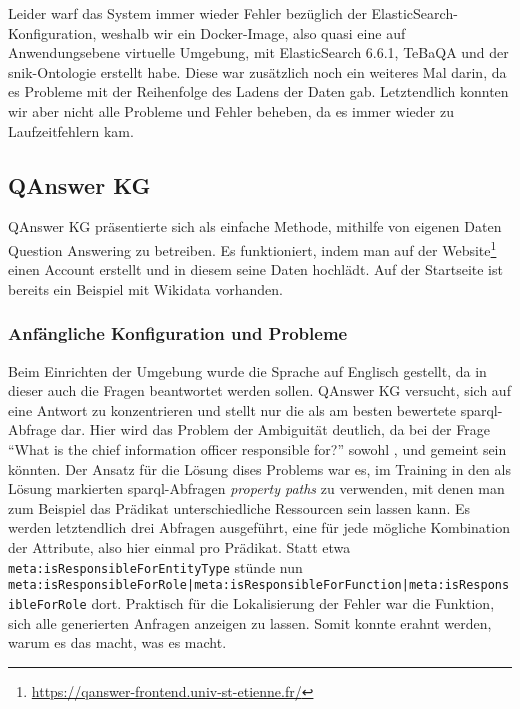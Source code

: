 Leider warf das System immer wieder Fehler bezüglich der ElasticSearch-Konfiguration, weshalb wir ein Docker-Image,
also quasi eine auf Anwendungsebene virtuelle Umgebung, mit ElasticSearch 6.6.1, TeBaQA und der \ac{snik}-Ontologie erstellt habe.
Diese war zusätzlich noch ein weiteres Mal darin, da es Probleme mit der Reihenfolge des Ladens der Daten gab.
Letztendlich konnten wir aber nicht alle Probleme und Fehler beheben, da es immer wieder zu Laufzeitfehlern kam.

\subsection{QAnswer KG}

QAnswer KG präsentierte sich als einfache Methode, mithilfe von eigenen Daten Question Answering zu betreiben.
Es funktioniert, indem man auf der Website\footnote{\url{https://qanswer-frontend.univ-st-etienne.fr/}} einen Account erstellt und in diesem seine Daten hochlädt.
Auf der Startseite ist bereits ein Beispiel mit Wikidata vorhanden.

\subsubsection{Anfängliche Konfiguration und Probleme}

Beim Einrichten der Umgebung wurde die Sprache auf Englisch gestellt, da in dieser auch die Fragen beantwortet werden sollen.
QAnswer KG versucht, sich auf eine Antwort zu konzentrieren und stellt nur die als am besten bewertete \ac{sparql}-Abfrage dar.
Hier wird das Problem der Ambiguität deutlich, da bei der Frage \enquote{What is the chief information officer responsible for?} sowohl
,  und  gemeint sein könnten.
Der Ansatz für die Lösung dises Problems war es, im Training in den als Lösung markierten \ac{sparql}-Abfragen \emph{property paths} zu verwenden,
mit denen man zum Beispiel das Prädikat unterschiedliche Ressourcen sein lassen kann.
Es werden letztendlich drei Abfragen ausgeführt, eine für jede mögliche Kombination der Attribute, also hier einmal pro Prädikat.
Statt etwa \texttt{meta:isResponsibleForEntityType} stünde nun \texttt{meta:isResponsibleForRole|meta:isResponsibleForFunction|meta:isResponsibleForRole} dort.
Praktisch für die Lokalisierung der Fehler war die Funktion, sich alle generierten Anfragen anzeigen zu lassen.
Somit konnte erahnt werden, warum es das macht, was es macht.

